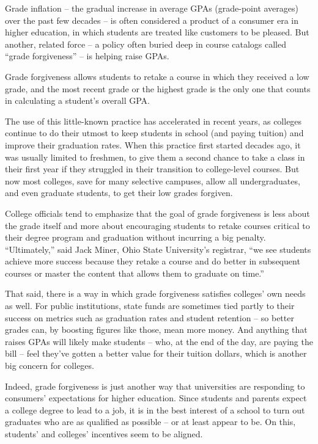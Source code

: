 Grade inflation – the gradual increase in average GPAs (grade-point averages) over the past few decades – is often considered a product of a consumer era in higher education, in which students are treated like customers to be pleased. But another, related force – a policy often buried deep in course catalogs called ``grade forgiveness'' – is helping raise GPAs.


Grade forgiveness allows students to retake a course in which they received a low grade, and the most recent grade or the highest grade is the only one that counts in calculating a student's overall GPA.


The use of this little-known practice has accelerated in recent years, as colleges continue to do their utmost to keep students in school (and paying tuition) and improve their graduation rates. When this practice first started decades ago, it was usually limited to freshmen, to give them a second chance to take a class in their first year if they struggled in their transition to college-level courses. But now most colleges, save for many selective campuses, allow all undergraduates, and even graduate students, to get their low grades forgiven.


College officials tend to emphasize that the goal of grade forgiveness is less about the grade itself and more about encouraging students to retake courses critical to their degree program and graduation without incurring a big penalty. ``Ultimately,'' said Jack Miner, Ohio State University's registrar, ``we see students achieve more success because they retake a course and do better in subsequent courses or master the content that allows them to graduate on time.''


That said, there is a way in which grade forgiveness satisfies colleges' own needs as well. For public institutions, state funds are sometimes tied partly to their success on metrics such as graduation rates and student retention – so better grades can, by boosting figures like those, mean more money. And anything that raises GPAs will likely make students – who, at the end of the day, are paying the bill – feel they've gotten a better value for their tuition dollars, which is another big concern for colleges.


Indeed, grade forgiveness is just another way that universities are responding to consumers' expectations for higher education. Since students and parents expect a college degree to lead to a job, it is in the best interest of a school to turn out graduates who are as qualified as possible – or at least appear to be. On this, students' and colleges' incentives seem to be aligned.